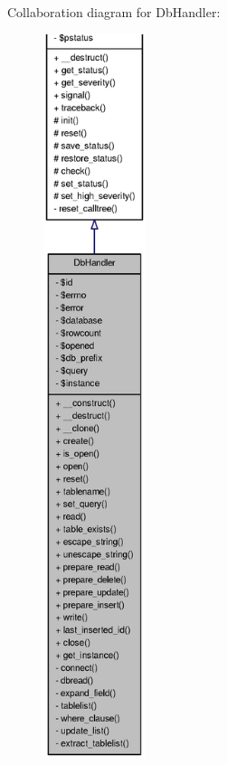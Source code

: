 Collaboration diagram for DbHandler:\nopagebreak
\begin{figure}[H]
\begin{center}
\leavevmode
\includegraphics[height=600pt]{classDbHandler__coll__graph}
\end{center}
\end{figure}
